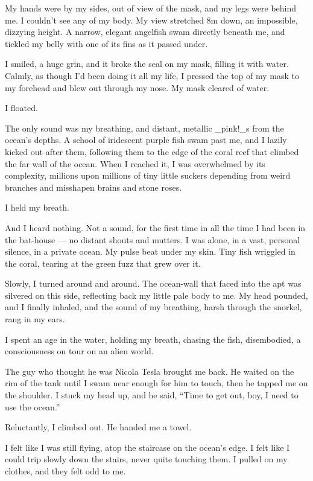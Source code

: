 My hands were by my sides, out of view of the mask, and my legs
were behind me. I couldn't see any of my body. My view stretched 8m
down, an impossible, dizzying height. A narrow, elegant angelfish
swam directly beneath me, and tickled my belly with one of its fins
as it passed under.

I smiled, a huge grin, and it broke the seal on my mask, filling it
with water. Calmly, as though I'd been doing it all my life, I
pressed the top of my mask to my forehead and blew out through my
nose. My mask cleared of water.

I floated.

The only sound was my breathing, and distant, metallic \_pink!\_s
from the ocean's depths. A school of iridescent purple fish swam
past me, and I lazily kicked out after them, following them to the
edge of the coral reef that climbed the far wall of the ocean. When
I reached it, I was overwhelmed by its complexity, millions upon
millions of tiny little suckers depending from weird branches and
misshapen brains and stone roses.

I held my breath.

And I heard nothing. Not a sound, for the first time in all the
time I had been in the bat-house --- no distant shouts and mutters.
I was alone, in a vast, personal silence, in a private ocean. My
pulse beat under my skin. Tiny fish wriggled in the coral, tearing
at the green fuzz that grew over it.

Slowly, I turned around and around. The ocean-wall that faced into
the apt was silvered on this side, reflecting back my little pale
body to me. My head pounded, and I finally inhaled, and the sound
of my breathing, harsh through the snorkel, rang in my ears.

I spent an age in the water, holding my breath, chasing the fish,
disembodied, a consciousness on tour on an alien world.

The guy who thought he was Nicola Tesla brought me back. He waited
on the rim of the tank until I swam near enough for him to touch,
then he tapped me on the shoulder. I stuck my head up, and he said,
``Time to get out, boy, I need to use the ocean.''

Reluctantly, I climbed out. He handed me a towel.

I felt like I was still flying, atop the staircase on the ocean's
edge. I felt like I could trip slowly down the stairs, never quite
touching them. I pulled on my clothes, and they felt odd to me.

